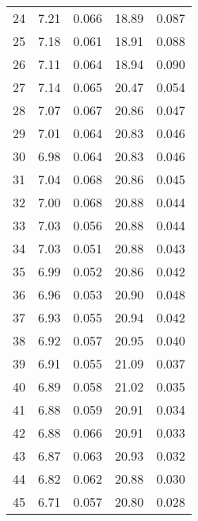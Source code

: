 \begin{table}
\begin{tabular}{c|ll|ll}
24 & 7.21 & 0.066 & 18.89 & 0.087 \\
25 & 7.18 & 0.061 & 18.91 & 0.088 \\
26 & 7.11 & 0.064 & 18.94 & 0.090 \\
27 & 7.14 & 0.065 & 20.47 & 0.054 \\
28 & 7.07 & 0.067 & 20.86 & 0.047 \\
29 & 7.01 & 0.064 & 20.83 & 0.046 \\
30 & 6.98 & 0.064 & 20.83 & 0.046 \\
31 & 7.04 & 0.068 & 20.86 & 0.045 \\
32 & 7.00 & 0.068 & 20.88 & 0.044 \\
33 & 7.03 & 0.056 & 20.88 & 0.044 \\
34 & 7.03 & 0.051 & 20.88 & 0.043 \\
35 & 6.99 & 0.052 & 20.86 & 0.042 \\
36 & 6.96 & 0.053 & 20.90 & 0.048 \\
37 & 6.93 & 0.055 & 20.94 & 0.042 \\
38 & 6.92 & 0.057 & 20.95 & 0.040 \\
39 & 6.91 & 0.055 & 21.09 & 0.037 \\
40 & 6.89 & 0.058 & 21.02 & 0.035 \\
41 & 6.88 & 0.059 & 20.91 & 0.034 \\
42 & 6.88 & 0.066 & 20.91 & 0.033 \\
43 & 6.87 & 0.063 & 20.93 & 0.032 \\
44 & 6.82 & 0.062 & 20.88 & 0.030 \\
45 & 6.71 & 0.057 & 20.80 & 0.028 \\
               \hline
        \end{tabular}
    \end{table}
    \clearpage

